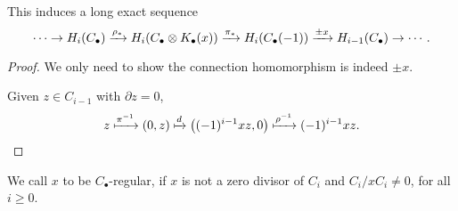\begin{coro}
  This induces a long exact sequence
  $$
  \cdots \to H_i(C_\bullet) \xrightarrow{\rho_*} H_i(C_\bullet \otimes K_\bullet(x)) \xrightarrow{\pi_*} 
  H_i(C_\bullet(-1)) \xrightarrow{\pm x} H_{i-1}(C_\bullet) \to \cdots.
  $$
  \begin{proof}
    We only need to show the connection homomorphism is indeed $\pm x$.

    Given $z \in C_{i-1}$ with $\partial z = 0$, 
    $$z \xmapsto{\pi^{-1}} (0, z) \xmapsto{d} \left((-1)^{i-1}xz, 0\right) \xmapsto{\rho^{-1}}
    (-1)^{i-1} xz.$$
  \end{proof}
\end{coro}

\begin{definition}
  We call $x$ to be $C_\bullet$-regular, if $x$ is not a zero divisor of $C_i$
  and $C_i / x C_i \neq 0$, for all $i \ge 0$.
\end{definition}

